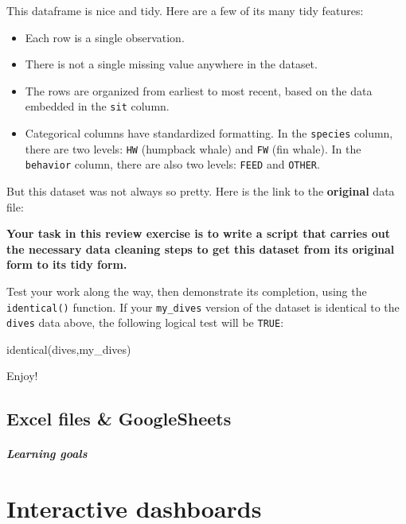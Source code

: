 \documentclass[
]{book}
\newenvironment{Shaded}{\begin{snugshade}}{\end{snugshade}}
\newcommand{\FunctionTok}[1]{\textcolor[rgb]{0.00,0.00,0.00}{#1}}
\newcommand{\NormalTok}[1]{#1}
\begin{document}
This dataframe is nice and tidy. Here are a few of its many tidy features:

\begin{itemize}
\item
  Each row is a single observation.
\item
  There is not a single missing value anywhere in the dataset.
\item
  The rows are organized from earliest to most recent, based on the data embedded in the \texttt{sit} column.
\item
  Categorical columns have standardized formatting. In the \texttt{species} column, there are two levels: \texttt{HW} (humpback whale) and \texttt{FW} (fin whale). In the \texttt{behavior} column, there are also two levels: \texttt{FEED} and \texttt{OTHER}.
\end{itemize}

But this dataset was not always so pretty. Here is the link to the \textbf{original} data file:

\textbf{Your task in this review exercise is to write a script that carries out the necessary data cleaning steps to get this dataset from its original form to its tidy form.}

Test your work along the way, then demonstrate its completion, using the \texttt{identical()} function. If your \texttt{my\_dives} version of the dataset is identical to the \texttt{dives} data above, the following logical test will be \texttt{TRUE}:

\begin{Shaded}
\begin{Highlighting}[]
\FunctionTok{identical}\NormalTok{(dives,my\_dives)}
\end{Highlighting}
\end{Shaded}

Enjoy!

\hypertarget{excel-files-googlesheets}{%
\chapter{Excel files \& GoogleSheets}\label{excel-files-googlesheets}}

\hypertarget{learning-goals-21}{%
\subsubsection*{Learning goals}\label{learning-goals-21}}

\hypertarget{part-interactive-dashboards}{%
\part{Interactive dashboards}\label{part-interactive-dashboards}}
\end{document}
